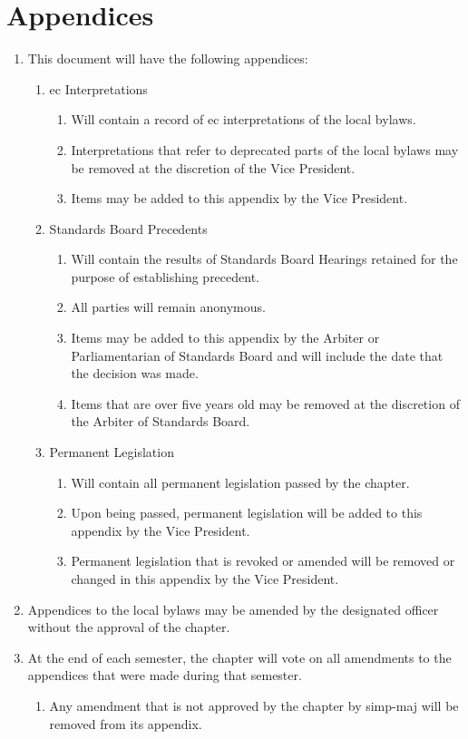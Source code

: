 \section{Appendices}
	\label{appendices}
	\begin{enumerate}
		\item This document will have the following appendices:
			\begin{enumerate}
				\item \gls{ec} Interpretations
					\begin{enumerate}
						\item Will contain a record of \gls{ec} interpretations of the local bylaws.
						\item Interpretations that refer to deprecated parts of the local bylaws may be removed at the discretion of the Vice President.
						\item Items may be added to this appendix by the Vice President.
					\end{enumerate}
				\item Standards Board Precedents
					\begin{enumerate}
						\item Will contain the results of Standards Board Hearings retained for the purpose of establishing precedent.
						\item All parties will remain anonymous.
						\item Items may be added to this appendix by the Arbiter or Parliamentarian of Standards Board and will include the date that the decision was made.
						\item Items that are over five years old may be removed at the discretion of the Arbiter of Standards Board.
					\end{enumerate}
				\item Permanent Legislation
					\begin{enumerate}
						\item Will contain all permanent legislation passed by the chapter.
						\item Upon being passed, permanent legislation will be added to this appendix by the Vice President.
						\item Permanent legislation that is revoked or amended will be removed or changed in this appendix by the Vice President.
					\end{enumerate}
			\end{enumerate}
        \item Appendices to the local bylaws may be amended by the designated officer without the approval of the chapter.
		\item At the end of each semester, the chapter will vote on all amendments to the appendices that were made during that semester.
			\begin{enumerate}
				\item Any amendment that is not approved by the chapter by \gls{simp-maj} will be removed from its appendix.
			\end{enumerate}
	\end{enumerate}
					

